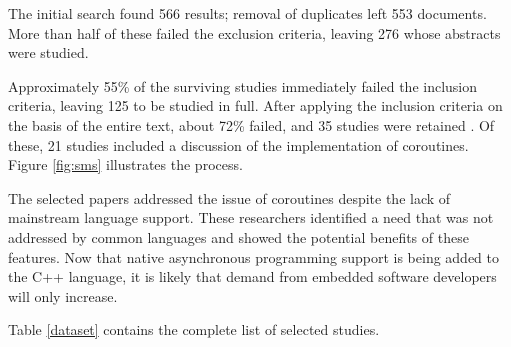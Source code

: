 The initial search found 566 results; removal of duplicates left 553 documents. More than half of these failed the exclusion criteria, leaving 276 whose abstracts were studied.

Approximately 55\% of the surviving studies immediately failed the inclusion criteria, leaving 125 to be studied in full. After applying the inclusion criteria on the basis of the entire text, about 72\% failed, and 35 studies were retained \cite{Alvira2013, Andalam2014, Andersen2016, Andersen2017b, Bergel2011, Boers2010, Clark2009, Cohen2007b, Durmaz2017, Elsts2017, Evers2007, Fritzsche2010, Glistvain2010, Inam2011, Jaaskelainen2008, Jahier2016, Kalebe2017, Karpin2007, Khezri2008, Kugler2013, Kumar2007, Liu2011, Lohmann2012, Motika2015, Niebert2014, Noman2017, Oldewurtel2009, Park2015, Riedel2010, Schimpf2012b, St-Amour2010, Strube2010, Susilo2009, VonHanxleden2009, Yu2008}. Of these, 21 studies included a discussion of the implementation of coroutines. \DIFaddbegin {}\DIFaddend Figure \ref{fig:sms} illustrates the process.

The selected papers addressed the issue of coroutines despite the lack of mainstream language support. These researchers identified a need that was not addressed by common languages and showed the potential benefits of these features. Now that native asynchronous programming support is being added to the C++ language, it is likely that demand from embedded software developers will only increase. 

\iffalse 
Table \ref{dataset} contains the complete list of selected studies.

